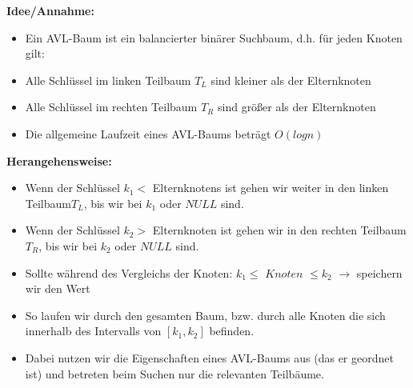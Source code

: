 \noindent
\textbf{Idee/Annahme:}

\begin{itemize}
	\item Ein AVL-Baum ist ein balancierter binärer Suchbaum, d.h. für jeden Knoten gilt:
	\item Alle Schlüssel im linken Teilbaum $T_{L}$ sind kleiner als der Elternknoten
	\item Alle Schlüssel im rechten Teilbaum $T_{R}$ sind größer als der Elternknoten
	\item Die allgemeine Laufzeit eines AVL-Baums beträgt $O(logn)$
\end{itemize}


\textbf{Herangehensweise:} 
\begin{itemize}
	\item Wenn der Schlüssel $k_{1}<$ Elternknotens ist gehen wir weiter in den linken Teilbaum$T_{L}$, bis wir bei $k_{1}$ oder $NULL$ sind.
	\item Wenn der Schlüssel $k_{2}>$ Elternknoten ist gehen wir in den rechten Teilbaum $T_{R}$, bis wir bei $k_{2}$ oder $NULL$ sind.
	\item Sollte während des Vergleichs der Knoten: $k_{1}\leq$ $Knoten$ $\leq k_{2}$ $\rightarrow$ speichern wir den Wert
	\item So laufen wir durch den gesamten Baum, bzw. durch alle Knoten die sich innerhalb des Intervalls von $[k_{1},k_{2}]$ befinden.
	\item Dabei nutzen wir die Eigenschaften eines AVL-Baums aus (das er geordnet ist) und betreten beim Suchen nur die relevanten Teilbäume.
\end{itemize}















